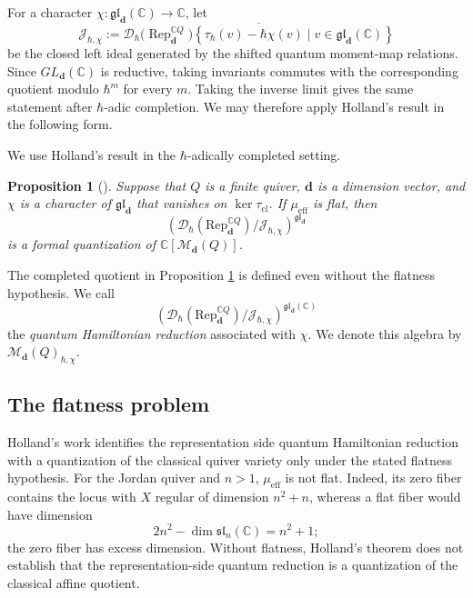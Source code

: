 \documentclass[11pt,reqno]{amsart}
\newtheorem{proposition}[theorem]{Proposition}
\theoremstyle{definition}
\newcommand{\bbC}{\mathbb{C}}
\newcommand{\gl}{\mathfrak{gl}}
\newcommand{\Rep}{\mathrm{Rep}}
\newcommand{\bd}{\mathbf{d}}
\newcommand{\mM}{\mathcal{M}}
\begin{document}
For a character \(\chi:\mathfrak{gl}_{\mathbf d}(\mathbb C)\to\mathbb C\), let
\[
\mathcal J_{\hbar,\chi}
:=
\overline{
\mathcal D_{\hbar}\bigl(\operatorname{Rep}^{\mathbb C Q}_{\mathbf d}\bigr)
\left\{
\tau_{\hbar}(v)-\hbar\chi(v)
\mid
v\in\mathfrak{gl}_{\mathbf d}(\mathbb C)
\right\}}
\]
be the closed left ideal generated by the shifted quantum moment-map relations. Since \(GL_{\mathbf d}(\mathbb C)\) is reductive, taking invariants commutes with the corresponding quotient modulo \(\hbar^m\) for every \(m\). Taking the inverse limit gives the same statement after \(\hbar\)-adic completion. We may therefore apply Holland’s result in the following form.

We use Holland's result in the \(\hbar\)-adically completed setting.
\begin{proposition}[{\cite[Proposition~2.4]{Hol1999}}]
\label{prop: holland}
Suppose that \(Q\) is a finite quiver, \(\bd\) is a dimension vector,
and \(\chi\) is a character of \(\gl_\bd\) that vanishes on
\(\ker\tau_{\mathrm{cl}}\).  If \(\mu_{\mathrm{eff}}\)
is flat, then
\[
\left(
\mathcal D_\hbar(\Rep^{\bbC Q}_\bd)/\mathcal J_{\hbar,\chi}
\right)^{\gl_\bd}
\]
is a formal quantization of \(\mathbb C[\mM_{\mathbf d}(Q)]\).
\end{proposition}

The completed quotient in Proposition \ref{prop: holland} is defined even
without the flatness hypothesis. We call
\[
\left(
\mathcal D_\hbar(\Rep^{\bbC Q}_\bd)/\mathcal J_{\hbar,\chi}
\right)^{\gl_\bd(\bbC)}
\]
the \emph{quantum Hamiltonian reduction} associated with \(\chi\).  We
denote this algebra by \({\mM_\bd(Q)}_{\hbar,\chi}\).







\subsection{The flatness problem}
Holland's work identifies the representation side quantum Hamiltonian reduction with a quantization of the classical quiver variety only under the stated flatness hypothesis.
For the Jordan quiver and \(n>1\), \(\mu_{\mathrm{eff}}\) is not flat.
Indeed, its zero fiber contains the locus with \(X\) regular
of dimension \(n^2+n\), whereas a flat fiber would have dimension
\[
2n^2-\dim\mathfrak{sl}_n(\bbC)=n^2+1;
\]
the zero fiber has excess dimension.
Without flatness, Holland's theorem does not establish that the representation-side quantum reduction is a quantization of the classical affine quotient.
\end{document}
